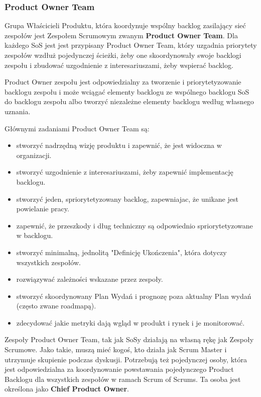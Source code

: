 \documentclass[12pt,a4paper,parskip=full]{scrartcl}
\begin{document}
\subsubsection{Product Owner Team}

Grupa Właścicieli Produktu, która koordynuje wspólny backlog zasilający sieć zespołów jest Zespołem Scrumowym zwanym \textbf{Product Owner Team}. Dla każdego SoS jest jest przypisany Product Owner Team, który uzgadnia priorytety zespołów wzdłuż pojedynczej ścieżki, żeby one skoordynowały swoje backlogi zespołu i zbudować uzgodnienie z interesariuszami, żeby wspierać backlog.

Product Owner zespołu jest odpowiedzialny za tworzenie i priorytetyzowanie backlogu zespołu i może wciągać elementy backlogu ze wspólnego backlogu SoS do backlogu zespołu albo tworzyć niezależne elementy backlogu według własnego uznania.

Głównymi zadaniami Product Owner Team są:

\begin{itemize}
	\item stworzyć nadrzędną wizję produktu i zapewnić, że jest widoczna w organizacji.
	\item stworzyć uzgodnienie z interesariuszami, żeby zapewnić implementację backlogu.
	\item stworzyć jeden, spriorytetyzowany backlog, zapewniajac, że unikane jest powielanie pracy.
	\item zapewnić, że przeszkody i dług techniczny są odpowiednio spriorytetyzowane w backlogu.
	\item stworzyć minimalną, jednolitą "Definicję Ukończenia", która dotyczy wszystkich zespołów.
	\item rozwiązywać zależności wskazane przez zespoły.
	\item stworzyć skoordynowany Plan Wydań i prognozę poza aktualny Plan wydań (często zwane roadmapą).
	\item zdecydować jakie metryki dają wgląd w produkt i rynek i je monitorować.
\end{itemize}

Zespoły Product Owner Team, tak jak SoSy działają na własną rękę jak Zespoły Scrumowe. Jako takie, muszą mieć kogoś, kto działa jak Scrum Master i utrzymuje skupienie podczas dyskusji. Potrzebują też pojedynczej osoby, która jest odpowiedzialna za koordynowanie powstawania pojedynczego Product Backlogu dla wszystkich zespołów w ramach Scrum of Scrums. Ta osoba jest określona jako \textbf{Chief Product Owner}.
\end{document}
